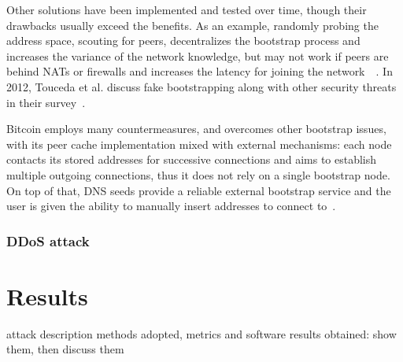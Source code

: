 \documentclass[12pt, letterpaper, twoside]{article}
\begin{document}
Other solutions have been implemented and tested over time, though their drawbacks usually exceed the benefits. As an example, randomly probing the address space, scouting for peers, decentralizes the bootstrap process and increases the variance of the network knowledge, but may not work if peers are behind NATs or firewalls and increases the latency for joining the network~\cite{decentrbootstrapp2p}~\cite{localityaware}. In 2012,  Touceda et al. discuss fake bootstrapping along with other security threats in their survey~\cite{toucedafakeboot}.

Bitcoin employs many countermeasures, and overcomes other bootstrap issues, with its peer cache implementation mixed with external mechanisms: each node contacts its stored addresses for successive connections and aims to establish multiple outgoing connections, thus it does not rely on a single bootstrap node. On top of that, DNS seeds provide a reliable external bootstrap service and the user is given the ability to manually insert addresses to connect to~\cite{mahmoud_netsec_boot}.


\subsubsection{DDoS attack}\label{sec:ddos}


\section{Results}\label{sec:res}
attack description
methods adopted, metrics and software
results obtained: show them, then discuss them




















\end{document}
